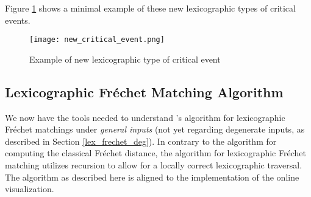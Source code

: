 Figure \ref{fig:new_critical_event} shows a minimal example of these new lexicographic types of critical events.

\begin{figure}[H]
    \centering
    
	\texttt{[image: new\_critical\_event.png]}
	
	\caption{Example of new lexicographic type of critical event\protect\footnotemark}
    \label{fig:new_critical_event}
\end{figure}


\subsection{Lexicographic Fréchet Matching Algorithm}\label{sec:lex_frechet_alg}

We now have the tools needed to understand \citeauthor{rotelex}'s algorithm for lexicographic Fréchet matchings\cite{rotelex} under \textit{general inputs} (not yet regarding degenerate inputs, as described in Section \ref{lex_frechet_deg}). In contrary to the algorithm for computing the classical Fréchet distance, the algorithm for lexicographic Fréchet matching utilizes recursion to allow for a locally correct lexicographic traversal. The algorithm as described here is aligned to the implementation of the online visualization.

